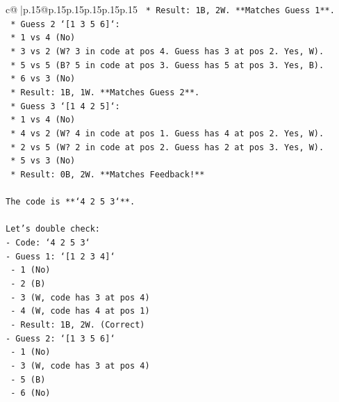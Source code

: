 \documentclass{article}
\begin{document}
{\begin{supertabular}{c@{$\;$}|p{.15\linewidth}@{}p{.15\linewidth}p{.15\linewidth}p{.15\linewidth}p{.15\linewidth}p{.15\linewidth}}
{{{\texttt{                        *   Result: 1B, 2W. **Matches Guess 1**.} \\
\texttt{                    *   Guess 2 `{[}1 3 5 6{]}`:} \\
\texttt{                        *   1 vs 4 (No)} \\
\texttt{                        *   3 vs 2 (W? 3 in code at pos 4. Guess has 3 at pos 2. Yes, W).} \\
\texttt{                        *   5 vs 5 (B? 5 in code at pos 3. Guess has 5 at pos 3. Yes, B).} \\
\texttt{                        *   6 vs 3 (No)} \\
\texttt{                        *   Result: 1B, 1W. **Matches Guess 2**.} \\
\texttt{                    *   Guess 3 `{[}1 4 2 5{]}`:} \\
\texttt{                        *   1 vs 4 (No)} \\
\texttt{                        *   4 vs 2 (W? 4 in code at pos 1. Guess has 4 at pos 2. Yes, W).} \\
\texttt{                        *   2 vs 5 (W? 2 in code at pos 2. Guess has 2 at pos 3. Yes, W).} \\
\texttt{                        *   5 vs 3 (No)} \\
\texttt{                        *   Result: 0B, 2W. **Matches Feedback!**} \\
\\ 
\texttt{The code is **`4 2 5 3`**.} \\
\\ 
\texttt{Let's double check:} \\
\texttt{{-}   Code: `4 2 5 3`} \\
\texttt{{-}   Guess 1: `{[}1 2 3 4{]}`} \\
\texttt{    {-}   1 (No)} \\
\texttt{    {-}   2 (B)} \\
\texttt{    {-}   3 (W, code has 3 at pos 4)} \\
\texttt{    {-}   4 (W, code has 4 at pos 1)} \\
\texttt{    {-}   Result: 1B, 2W. (Correct)} \\
\texttt{{-}   Guess 2: `{[}1 3 5 6{]}`} \\
\texttt{    {-}   1 (No)} \\
\texttt{    {-}   3 (W, code has 3 at pos 4)} \\
\texttt{    {-}   5 (B)} \\
\texttt{    {-}   6 (No)} \\
}}}
\end{supertabular}}
\end{document}
